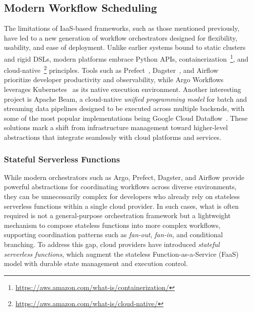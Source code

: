 \subsection{Modern Workflow Scheduling}

The limitations of IaaS-based frameworks, such as those mentioned previously, have led to a new generation of workflow orchestrators designed for flexibility, usability, and ease of deployment. Unlike earlier systems bound to static clusters and rigid DSLs, modern platforms embrace Python APIs, containerization~\footnote{\url{https://aws.amazon.com/what-is/containerization/}}, and cloud-native~\footnote{\url{https://aws.amazon.com/what-is/cloud-native/}} principles. Tools such as Prefect~\cite{prefect}, Dagster~\cite{dagster}, and Airflow~\cite{apache_airflow} prioritize developer productivity and observability, while Argo Workflows~\cite{argo_workflows} leverages Kubernetes~\cite{kubernetes} as its native execution environment. Another interesting project is Apache Beam, a cloud-native \textit{unified programming model} for batch and streaming data pipelines designed to be executed across multiple backends, with some of the most popular implementations being Google Cloud Dataflow~\cite{google_dataflow}. These solutions mark a shift from infrastructure management toward higher-level abstractions that integrate seamlessly with cloud platforms and services.

\subsubsection{Stateful Serverless Functions}

While modern orchestrators such as Argo, Prefect, Dagster, and Airflow provide powerful abstractions for coordinating workflows across diverse environments, they can be unnecessarily complex for developers who already rely on stateless serverless functions within a single cloud provider. In such cases, what is often required is not a general-purpose orchestration framework but a lightweight mechanism to compose stateless functions into more complex workflows, supporting coordination patterns such as \textit{fan-out}, \textit{fan-in}, and conditional branching. To address this gap, cloud providers have introduced \textit{stateful serverless functions}, which augment the stateless Function-as-a-Service (FaaS) model with durable state management and execution control.

